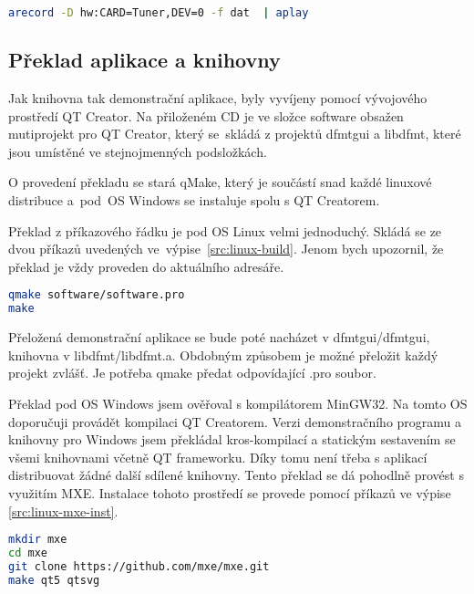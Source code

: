 \begin{lstlisting}[language=bash, label=src:linux-play, caption=Přehrávání zvuku pod OS Linux.]
arecord -D hw:CARD=Tuner,DEV=0 -f dat  | aplay
\end{lstlisting}

\subsection{Překlad aplikace a knihovny}
Jak knihovna tak demonstrační aplikace, byly vyvíjeny pomocí vývojového prostředí QT Creator. Na přiloženém CD je ve složce software obsažen mutiprojekt pro QT Creator, který se~skládá z projektů dfmtgui a libdfmt, které jsou umístěné ve stejnojmenných podsložkách.

O provedení překladu se stará qMake, který je součástí snad každé linuxové distribuce a~pod~OS Windows se instaluje spolu s QT Creatorem.

Překlad z příkazového řádku je pod OS Linux velmi jednoduchý. Skládá se ze dvou příkazů uvedených ve~výpise~\ref{src:linux-build}. Jenom bych upozornil, že překlad je vždy proveden do aktuálního adresáře.

\begin{lstlisting}[language=bash, label=src:linux-build, caption=Překlad pod OS Linux z příkazové řádku.]
qmake software/software.pro
make
\end{lstlisting}

Přeložená demonstrační aplikace se bude poté nacházet v dfmtgui/dfmtgui, knihovna v libdfmt/libdfmt.a. Obdobným způsobem je možné přeložit každý projekt zvlášť. Je potřeba qmake předat odpovídající .pro soubor.

Překlad pod OS Windows jsem ověřoval s kompilátorem MinGW32. Na tomto OS doporučuji provádět kompilaci QT Creatorem. Verzi demonstračního programu a knihovny pro Windows jsem překládal kros-kompilací a statickým sestavením se všemi knihovnami včetně QT frameworku. Díky tomu není třeba s aplikací distribuovat žádné další sdílené knihovny. Tento překlad se dá pohodlně provést s využitím MXE. Instalace tohoto prostředí se provede pomocí příkazů ve výpise \ref{src:linux-mxe-inst}.

\begin{lstlisting}[language=bash, label=src:linux-mxe-inst, caption=Instalace MXE umožňující překlad pro Windows na Linuxu.]
mkdir mxe
cd mxe
git clone https://github.com/mxe/mxe.git
make qt5 qtsvg
\end{lstlisting}

